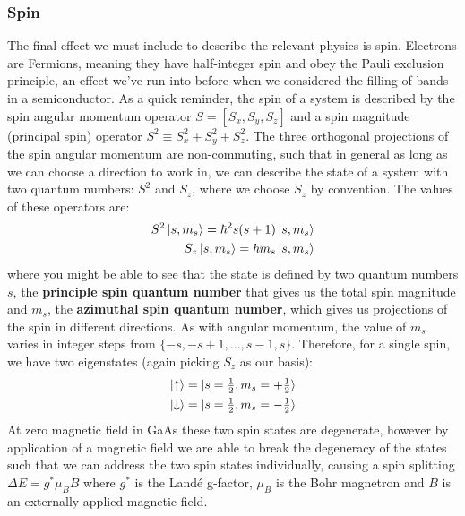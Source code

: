 \subsubsection{Spin}
The final effect we must include to describe the relevant physics is spin. Electrons are Fermions, meaning
they have half-integer spin and obey the Pauli exclusion principle, an effect we've run into before when we considered
the filling of bands in a semiconductor. As a quick reminder, the spin of a system is described by the spin angular momentum operator
$S = [S_x, S_y, S_z]$ and a spin magnitude (principal spin) operator $S^2 \equiv S_x^2 + S_y^2 + S_z^2$. The three orthogonal projections of the spin
angular momentum are non-commuting, such that in general as long as we can choose a direction to work in, we can describe the
state of a system with two quantum numbers: $S^2$ and $S_z$, where we choose $S_z$ by convention. The values of these operators
are:
\begin{eqnarray}
  S^2\ket{s, m_s} = \hbar^2s(s + 1)\ket{s, m_s} \\
  S_z\ket{s, m_s} = \hbar m_s\ket{s, m_s}
\end{eqnarray}
where you might be able to see that the state is defined by two quantum numbers $s$, the \textbf{principle spin quantum number} that gives
us the total spin magnitude and $m_s$, the \textbf{azimuthal spin quantum number}, which gives us projections of the spin in different directions.
As with angular momentum, the value of $m_s$ varies in integer steps from $\{-s, -s+1, ..., s-1, s\}$. Therefore, for a single spin, we have two
eigenstates (again picking $S_z$ as our basis):
\begin{eqnarray}
  \ket{\uparrow} = \ket{s = \tfrac{1}{2}, m_s = +\tfrac{1}{2}} \\
  \ket{\downarrow} = \ket{s = \tfrac{1}{2}, m_s = -\tfrac{1}{2}}
\end{eqnarray}
At zero magnetic field in GaAs these two spin states are degenerate, however by application of a magnetic
field we are able to break the degeneracy of the states such that we can address the two spin states individually,
causing a spin splitting $\Delta E = g^* \mu_B B$ where $g^*$ is the Landé g-factor, $\mu_B$ is the Bohr
magnetron and $B$ is an externally applied magnetic field.

